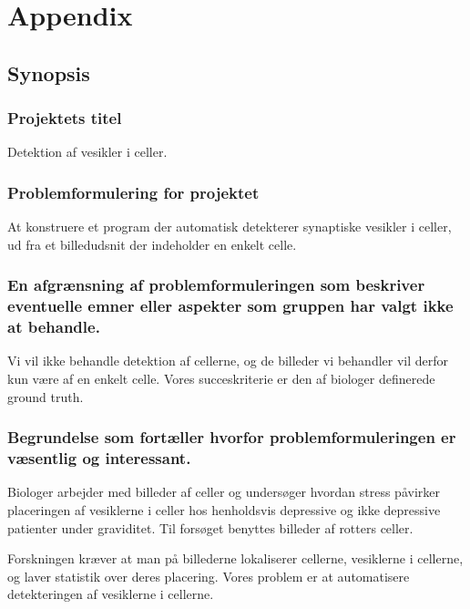 \newpage
\thispagestyle{plain}
\section{Appendix}
\subsection*{Synopsis}
\subsubsection*{Projektets titel}
Detektion af vesikler i celler.

\subsubsection*{Problemformulering for projektet}
At konstruere et program der automatisk detekterer synaptiske vesikler i celler, ud fra et billedudsnit der indeholder en enkelt celle. 

\subsubsection*{En afgrænsning af problemformuleringen som beskriver eventuelle emner eller aspekter som gruppen har valgt ikke at behandle. }
Vi vil ikke behandle detektion af cellerne, og de billeder vi behandler vil derfor kun være af en enkelt celle. Vores succeskriterie er den af biologer definerede ground truth.

\subsubsection*{Begrundelse som fortæller hvorfor problemformuleringen er væsentlig og interessant. }
Biologer arbejder med billeder af celler og undersøger hvordan stress påvirker placeringen af vesiklerne i celler hos henholdsvis depressive og ikke depressive patienter under graviditet. Til forsøget benyttes billeder af rotters celler. 

Forskningen kræver at man på billederne lokaliserer cellerne, vesiklerne i cellerne, og laver statistik over deres placering. Vores problem er at automatisere detekteringen af vesiklerne i cellerne.
